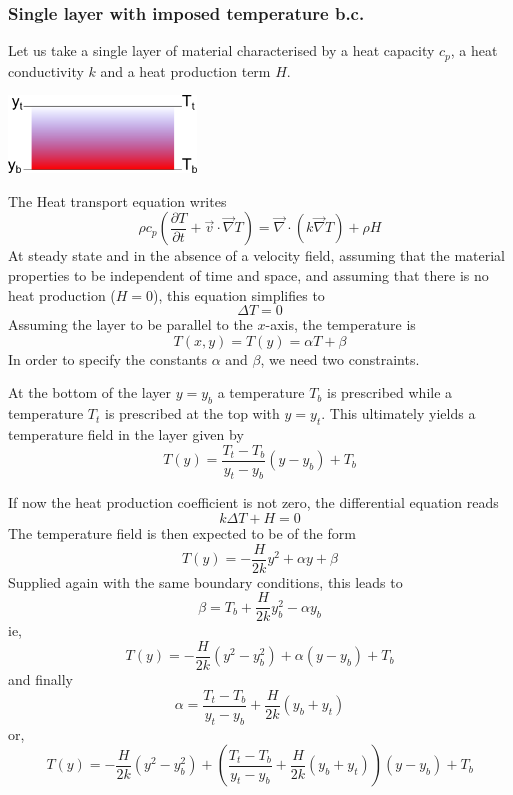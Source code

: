 \subsubsection{Single layer with imposed temperature b.c.}

Let us take a single layer of material characterised by
a heat capacity $c_p$, a heat conductivity $k$
and a heat production term $H$.

\begin{center}
\includegraphics[width=5cm]{images/initial_temperature/tempcond.png}
\end{center}

The Heat transport equation writes
\[
\rho c_p ( \frac{\partial T}{\partial t} + {\vec v} \cdot {\vec \nabla} { T}) = 
{\vec \nabla} \cdot (k {\vec \nabla} T) + \rho H
\]
At steady state and in the absence of a velocity field, assuming
that the material properties to be independent of time and space, and 
assuming that
there is no heat production ($H=0$), this equation
simplifies to
\[
\Delta T =0 
\]
Assuming the layer to be parallel to the $x$-axis, the temperature is
\[
T(x,y)=T(y)=\alpha T+ \beta
\]
In order to specify the constants $\alpha$ and $\beta$, we need two constraints.

At the bottom of the layer $y=y_b$ a temperature $T_b$ is prescribed while a temperature
$T_t$ is prescribed at the top with $y=y_t$. This ultimately yields a temperature field in
the layer given by
\[
\boxed{
T(y) = \frac{T_t-T_b}{y_t-y_b}(y-y_b) + T_b
}
\]

If now the heat production coefficient is not zero, the differential equation
reads
\[
 k \Delta T + H = 0 
\]
The temperature field is then expected to be of the form
\[
T(y)= - \frac{H}{2k} y^2 + \alpha y + \beta 
\]
Supplied again with the same boundary conditions, this leads to
\[
\beta=T_b + \frac{H}{2k} y_b^2 - \alpha y_b
\]
ie,
\[
T(y) = -\frac{H}{2k} (y^2-y_b^2) + \alpha (y-y_b) + T_b
\]
and finally
\[
\alpha =  \frac{T_t-T_b}{y_t-y_b}  + \frac{H}{2k}(y_b+y_t)
\]
or,
\[
T(y) = -\frac{H}{2k} (y^2-y_b^2) + \left( \frac{T_t-T_b}{y_t-y_b}  + \frac{H}{2k}(y_b+y_t)   \right) (y-y_b) + T_b
\]

